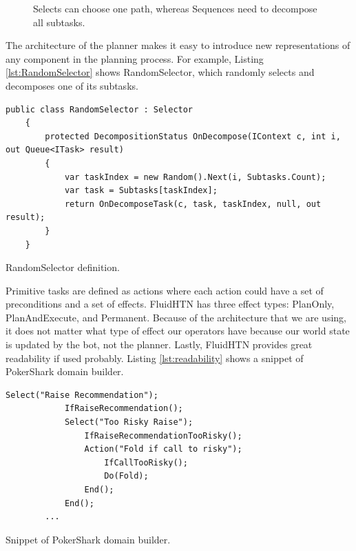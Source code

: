 \begin{figure}[h]
    \centering
    \caption{Selects can choose one path, whereas Sequences need to decompose all subtasks.}
    \label{fig:select_sequence}
\end{figure}

The architecture of the planner makes it easy to introduce new representations of any component in the planning process. For example, Listing \ref{lst:RandomSelector} shows RandomSelector, which randomly selects and decomposes one of its subtasks.

\begin{Listing}
    \begin{lstlisting}[language={[Sharp]C}]
    public class RandomSelector : Selector
    {
        protected DecompositionStatus OnDecompose(IContext c, int i, out Queue<ITask> result)
        {
            var taskIndex = new Random().Next(i, Subtasks.Count);
            var task = Subtasks[taskIndex];
            return OnDecomposeTask(c, task, taskIndex, null, out result);
        }
    }
    \end{lstlisting}
    \caption{RandomSelector definition.}
    \label{lst:RandomSelector}
\end{Listing}

Primitive tasks are defined as actions where each action could have a set of preconditions and a set of effects. FluidHTN has three effect types: PlanOnly, PlanAndExecute, and Permanent. Because of the architecture that we are using, it does not matter what type of effect our operators have because our world state is updated by the bot, not the planner. Lastly, FluidHTN provides great readability if used probably. Listing \ref{lst:readability} shows a snippet of PokerShark domain builder.
\begin{Listing}
    \begin{lstlisting}[language={[Sharp]C}]
        Select("Raise Recommendation");    
            IfRaiseRecommendation();
            Select("Too Risky Raise");
                IfRaiseRecommendationTooRisky();
                Action("Fold if call to risky");
                    IfCallTooRisky();
                    Do(Fold);
                End();
            End();
        ...
    \end{lstlisting}
    \caption{Snippet of PokerShark domain builder.}
    \label{lst:readability}
\end{Listing}